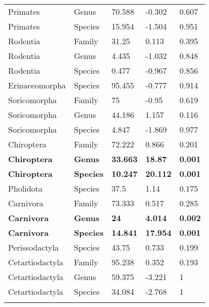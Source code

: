 \begin{longtable}{lllll}
  Primates & Genus & 70.588 & -0.302 & 0.607 \\ 
  Primates & Species & 15.954 & -1.504 & 0.951 \\ 
  Rodentia & Family & 31.25 & 0.113 & 0.395 \\ 
  Rodentia & Genus & 4.435 & -1.032 & 0.848 \\ 
  Rodentia & Species & 0.477 & -0.967 & 0.856 \\ 
  Erinaceomorpha & Species & 95.455 & -0.777 & 0.914 \\ 
  Soricomorpha & Family & 75 & -0.95 & 0.619 \\ 
  Soricomorpha & Genus & 44.186 & 1.157 & 0.116 \\ 
  Soricomorpha & Species & 4.847 & -1.869 & 0.977 \\ 
  Chiroptera & Family & 72.222 & 0.866 & 0.201 \\ 
  \textbf{Chiroptera} & \textbf{Genus} & \textbf{33.663} & \textbf{18.87} & \textbf{0.001} \\ 
  \textbf{Chiroptera} & \textbf{Species} & \textbf{10.247} & \textbf{20.112} & \textbf{0.001} \\ 
  Pholidota & Species & 37.5 & 1.14 & 0.175 \\ 
  Carnivora & Family & 73.333 & 0.517 & 0.285 \\ 
  \textbf{Carnivora} & \textbf{Genus} & \textbf{24} & \textbf{4.014} & \textbf{0.002} \\ 
  \textbf{Carnivora} & \textbf{Species} & \textbf{14.841} & \textbf{17.954} & \textbf{0.001} \\ 
  Perissodactyla & Species & 43.75 & 0.733 & 0.199 \\ 
  Cetartiodactyla & Family & 95.238 & 0.352 & 0.193 \\ 
  Cetartiodactyla & Genus & 59.375 & -3.221 & 1 \\ 
  Cetartiodactyla & Species & 34.084 & -2.768 & 1 \\ 
   \hline
\hline
\label{Table_data_structure}
\end{longtable}
